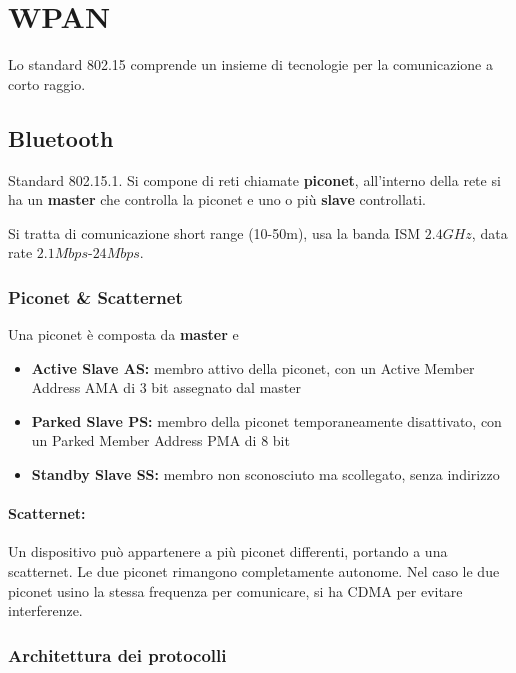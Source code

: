 \section{WPAN}

Lo standard 802.15 comprende un insieme di tecnologie per la comunicazione a corto raggio.

\subsection{Bluetooth}

Standard 802.15.1. Si compone di reti chiamate \textbf{piconet}, all'interno della rete si ha un \textbf{master} che controlla la piconet e uno o più \textbf{slave} controllati.

Si tratta di comunicazione short range (10-50m), usa la banda ISM $2.4GHz$, data rate $2.1Mbps$-$24Mbps$.

\subsubsection{Piconet \& Scatternet}

Una piconet è composta da \textbf{master} e 
\begin{itemize}
    \item \textbf{Active Slave AS:} membro attivo della piconet, con un Active Member Address AMA di 3 bit assegnato dal master
    
    \item \textbf{Parked Slave PS:} membro della piconet temporaneamente disattivato, con un Parked Member Address PMA di 8 bit
    
    \item \textbf{Standby Slave SS:} membro non sconosciuto ma scollegato, senza indirizzo
\end{itemize}

\paragraph{Scatternet:} Un dispositivo può appartenere a più piconet differenti, portando a una scatternet. Le due piconet rimangono completamente autonome. Nel caso le due piconet usino la stessa frequenza per comunicare, si ha CDMA per evitare interferenze.

\subsubsection{Architettura dei protocolli}

